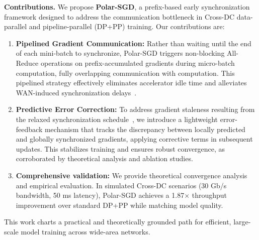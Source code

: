 
\textbf{Contributions.}
We propose \textbf{Polar-SGD}, a prefix-based early synchronization framework designed to address the communication bottleneck in Cross-DC data-parallel and pipeline-parallel (DP+PP) training. Our contributions are:
\begin{enumerate}
    \item \textbf{Pipelined Gradient Communication:} Rather than waiting until the end of each mini-batch to synchronize, Polar-SGD triggers non-blocking All-Reduce operations on prefix-accumulated gradients during micro-batch computation, fully overlapping communication with computation. This pipelined strategy effectively eliminates accelerator idle time and alleviates WAN-induced synchronization delays~\cite{yu2023cross}.
    \item \textbf{Predictive Error Correction:} To address gradient staleness resulting from the relaxed synchronization schedule~\cite{stich2018sparsified, zhang2023errorfeedback, zhou2023integrating, DBLP:conf/icml/XuH22, DBLP:conf/aaai/XuHH21, DBLP:conf/icml/KarimireddyRSJ19}, we introduce a lightweight error-feedback mechanism that tracks the discrepancy between locally predicted and globally synchronized gradients, applying corrective terms in subsequent updates. This stabilizes training and ensures robust convergence, as corroborated by theoretical analysis and ablation studies.
    \item \textbf{Comprehensive validation:} We provide theoretical convergence analysis and empirical evaluation. In simulated Cross-DC scenarios (30 Gb/s bandwidth, 50 ms latency), Polar-SGD achieves a 1.87$\times$ throughput improvement over standard DP+PP while matching model quality.
\end{enumerate}
This work charts a practical and theoretically grounded path for efficient, large-scale model training across wide-area networks.


% 